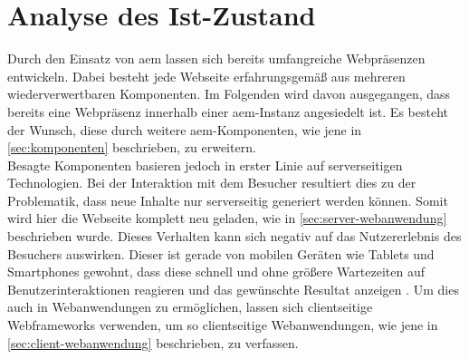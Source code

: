 \chapter{Analyse des Ist-Zustand}
\label{sec:ist-zustand}

Durch den Einsatz von \ac{aem} lassen sich bereits umfangreiche Webpräsenzen entwickeln. Dabei besteht jede Webseite erfahrungsgemäß aus mehreren wiederverwertbaren Komponenten. Im Folgenden wird davon ausgegangen, dass bereits eine Webpräsenz innerhalb einer \ac{aem}-Instanz angesiedelt ist. Es besteht der Wunsch, diese durch weitere \ac{aem}-Komponenten, wie jene in \autoref{sec:komponenten} beschrieben, zu erweitern.
\\
Besagte Komponenten basieren jedoch in erster Linie auf serverseitigen Technologien. Bei der Interaktion mit dem Besucher resultiert dies zu der Problematik, dass neue Inhalte nur serverseitig generiert werden können. Somit wird hier die Webseite komplett neu geladen, wie in \autoref{sec:server-webanwendung} beschrieben wurde. Dieses Verhalten kann sich negativ auf das Nutzererlebnis des Besuchers auswirken. Dieser ist gerade von mobilen Geräten wie Tablets und Smartphones gewohnt, dass diese schnell und ohne größere Wartezeiten auf Benutzerinteraktionen reagieren und das gewünschte Resultat anzeigen \cite[S. 78]{Rizvanoglu2013}. Um dies auch in Webanwendungen zu ermöglichen, lassen sich clientseitige Webframeworks verwenden, um so clientseitige Webanwendungen, wie jene in \autoref{sec:client-webanwendung} beschrieben, zu verfassen.\\





%